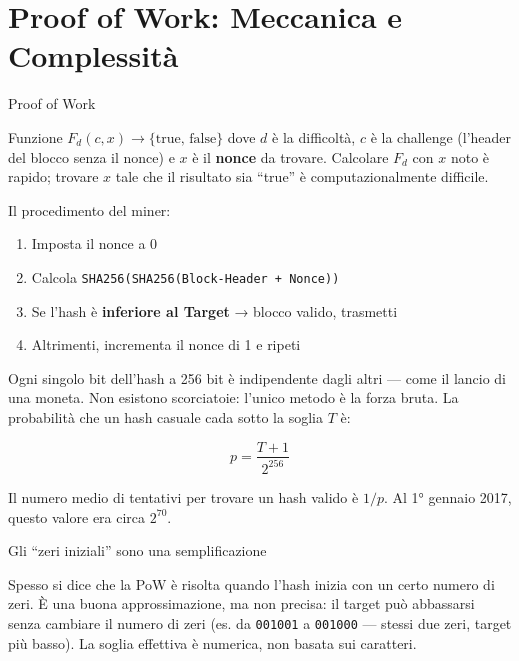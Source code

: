 \documentclass[
  italian,
  openany]{book}
\providecommand{\tightlist}{%
  \setlength{\itemsep}{0pt}\setlength{\parskip}{0pt}}
\begin{document}
\section{Proof of Work: Meccanica e
Complessità}\label{proof-of-work-meccanica-e-complessituxe0}

\begin{calloutdefinition}{Proof of Work}

Funzione \(F_d(c, x) \to \{\text{true, false}\}\) dove \(d\) è la
difficoltà, \(c\) è la challenge (l'header del blocco senza il nonce) e
\(x\) è il \textbf{nonce} da trovare. Calcolare \(F_d\) con \(x\) noto è
rapido; trovare \(x\) tale che il risultato sia ``true'' è
computazionalmente difficile.

\end{calloutdefinition}

Il procedimento del miner:

\begin{enumerate}
\def\labelenumi{\arabic{enumi}.}
\tightlist
\item
  Imposta il nonce a 0
\item
  Calcola \texttt{SHA256(SHA256(Block-Header\ +\ Nonce))}
\item
  Se l'hash è \textbf{inferiore al Target} → blocco valido, trasmetti
\item
  Altrimenti, incrementa il nonce di 1 e ripeti
\end{enumerate}

Ogni singolo bit dell'hash a 256 bit è indipendente dagli altri --- come
il lancio di una moneta. Non esistono scorciatoie: l'unico metodo è la
forza bruta. La probabilità che un hash casuale cada sotto la soglia
\(T\) è:

\[p = \frac{T + 1}{2^{256}}\]

Il numero medio di tentativi per trovare un hash valido è \(1/p\). Al 1°
gennaio 2017, questo valore era circa \(2^{70}\).

\begin{callouttip}{Gli “zeri iniziali” sono una semplificazione}

Spesso si dice che la PoW è risolta quando l'hash inizia con un certo
numero di zeri. È una buona approssimazione, ma non precisa: il target
può abbassarsi senza cambiare il numero di zeri (es. da \texttt{001001}
a \texttt{001000} --- stessi due zeri, target più basso). La soglia
effettiva è numerica, non basata sui caratteri.

\end{callouttip}
\end{document}
